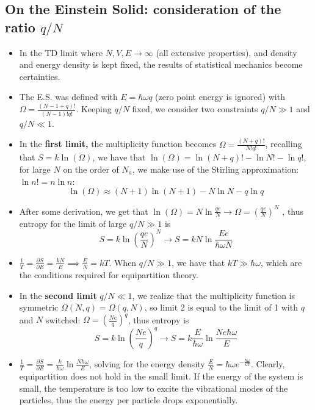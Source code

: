\documentclass[8pt]{article}
\begin{document}
\subsection{On the Einstein Solid: consideration of the ratio $q/N$}
\begin{itemize}
    \item In the TD limit where $N, V, E \rightarrow \infty$ (all extensive properties), and density and energy density is kept fixed, the results of statistical mechanics become certainties. 
    \item The E.S. was defined with $E = \hbar \omega q$ (zero point energy is ignored) with $\Omega = \frac{(N-1+q)!}{(N-1)!q!}$. Keeping $q/N$ fixed, we consider two constraints $q/N \gg 1$ and $q/N \ll 1$. 
    \item In the \textbf{first limit,} the multiplicity function becomes $\Omega = \frac{(N+q)!}{N!q!}$, recalling that $S =k \ln (\Omega)$, we have that $\ln(\Omega) = \ln (N+q)! - \ln N! - \ln q!$, for large $N$ on the order of $N_a$, we make use of the Stirling approximation: $\ln n! = n \ln n$: \[ \ln(\Omega) \approx (N+1) \ln(N+1) - N \ln N - q \ln q \]
    \item  After some derivation, we get that $\ln(\Omega) = N \ln \frac{qe}{N} \rightarrow \Omega = (\frac{qe}{N})^N$ , thus entropy for the limit of large $q/N \gg 1$ is \begin{equation}
        S = k \ln \left(\frac{qe}{N}\right)^N \rightarrow S = kN \ln \frac{Ee}{\hbar \omega N} 
    \end{equation}
    \item $\frac{1}{T} = \frac{\partial S}{\partial E} = \frac{kN}{E} \implies \frac{E}{N} = kT$. When $q/N \gg 1$, we have that $kT \gg \hbar \omega$, which are the conditions required for equipartition theory.  
    \item In the \textbf{second limit} $q/N \ll 1$, we realize that the multiplicity function is symmetric $\Omega(N, q) = \Omega(q,N)$, so limit 2 is equal to the limit of 1 with $q$ and $N$ switched: $\Omega = (\frac{Ne}{q})^q$, thus entropy is \begin{equation}
        S = k \ln \left(\frac{Ne}{q} \right)^q \rightarrow S = k \frac{E}{\hbar \omega} \ln \frac{N e \hbar \omega}{E}
        \end{equation}
        \item $\frac{1}{T} = \frac{\partial S}{\partial E} = \frac{k}{\hbar \omega} \ln \frac{N\hbar \omega}{E}$, solving for the energy density $\frac{E}{N} = \hbar \omega e^{-\frac{\hbar \omega}{kT}}$. Clearly, equipartition does not hold in the small limit. If the energy of the system is small, the temperature is too low to excite the vibrational modes of the particles, thus the energy per particle drops exponentially.
\end{itemize}
\end{document}
